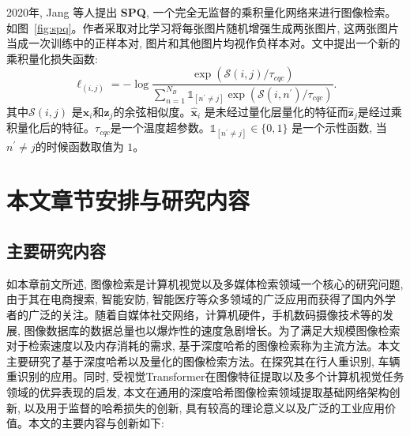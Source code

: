 2020年, Jang 等人提出 \textbf{SPQ}, 一个完全无监督的乘积量化网络来进行图像检索。如图~\ref{fig:spq}。作者采取对比学习将每张图片随机增强生成两张图片, 这两张图片当成一次训练中的正样本对, 图片和其他图片均视作负样本对。文中提出一个新的乘积量化损失函数:
\begin{equation}
    \ell_{(i, j)}=-\log \frac{\exp \left(\mathcal{S}(i, j) / \tau_{c q c}\right)}{\sum_{n=1}^{N_B} \mathbb{1}_{\left[n^{\prime} \neq j\right]} \exp \left(\mathcal{S}\left(i, n^{\prime}\right) / \tau_{c q c}\right)}.
\end{equation}
其中$\mathcal{S}(i, j)$ 是$\mathbf{\hat{x}}_i$和$\mathbf{\hat{z}}_j$的余弦相似度。$\mathbf{\hat{x}}_i$ 是未经过量化层量化的特征而$\mathbf{\hat{z}}_j$是经过乘积量化后的特征。$\tau_{c q c}$是一个温度超参数。$\mathbb{1}_{\left[n^{\prime} \neq j\right]} \in\{0,1\}$ 是一个示性函数, 当$n^{\prime} \neq j$的时候函数取值为 $1$。


\section{本文章节安排与研究内容}
\subsection{主要研究内容}
如本章前文所述, 图像检索是计算机视觉以及多媒体检索领域一个核心的研究问题, 由于其在电商搜索, 智能安防, 智能医疗等众多领域的广泛应用而获得了国内外学者的广泛的关注。随着自媒体社交网络，计算机硬件，手机数码摄像技术等的发展, 图像数据库的数据总量也以爆炸性的速度急剧增长。为了满足大规模图像检索对于检索速度以及内存消耗的需求, 基于深度哈希的图像检索称为主流方法。本文主要研究了基于深度哈希以及量化的图像检索方法。在探究其在行人重识别, 车辆重识别的应用。同时, 受视觉Transformer在图像特征提取以及多个计算机视觉任务领域的优异表现的启发, 本文在通用的深度哈希图像检索领域提取基础网络架构创新, 以及用于监督的哈希损失的创新, 具有较高的理论意义以及广泛的工业应用价值。本文的主要内容与创新如下: \par

